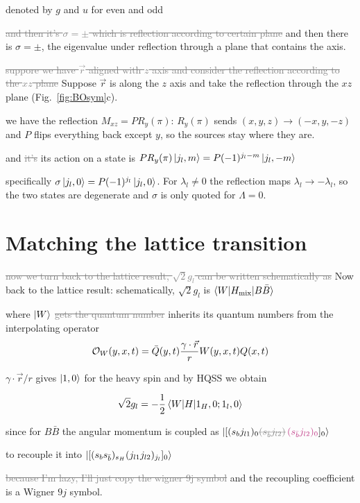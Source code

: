 \documentclass[11pt,a4paper]{article}
\newcommand{\ai}[1]{\textcolor{aicolor}{#1}}
\newcommand{\aifix}[2]{\textcolor{gray}{\sout{#1}} \textcolor{aicolor}{#2}}
\newcommand{\aifixm}[2]{\textcolor{gray}{\text{\sout{$#1$}}}\,\textcolor{aicolor}{#2}}
\newcommand{\ai}[1]{#1}
\newcommand{\aifix}[2]{#2}
\newcommand{\aifixm}[2]{#2}
\begin{document}
denoted by $g$ and $u$ for even and odd

\aifix{and then it's $\sigma = \pm$ which is reflection according to certain plane}{and then there is $\sigma=\pm$, the eigenvalue under reflection through a plane that contains the axis.}

\aifix{suppore we have $\vec{r}$ aligned with $z$ axis and consider the reflection according to the $xz$ plane}{Suppose $\vec r$ is along the $z$ axis and take the reflection through the $xz$ plane (Fig.~\ref{fig:BOsym}c).}

we have the reflection $M_{xz} = P R_y(\pi)$\ai{: $R_y(\pi)$ sends $(x,y,z)\to(-x,y,-z)$ and $P$ flips everything back except $y$, so the sources stay where they are.}

and \aifix{it's}{its} action on a state is $P R_y(\pi)\ket{j_l, m} = P(-1)^{j_l - m}\ket{j_l,-m}$

specifically $\sigma\ket{j_l,0} = P(-1)^{j_l}\ket{j_l,0}$\ai{. For $\lambda_l\neq0$ the reflection maps $\lambda_l\to-\lambda_l$, so the two states are degenerate and $\sigma$ is only quoted for $\Lambda=0$.}

\section{Matching the lattice transition}

\aifix{now we turn back to the lattice result, $\sqrt{2}g_l$ can be written schematically as}{Now back to the lattice result: schematically, $\sqrt{2}g_l$ is} $\braket{W|H_\text{mix}|B\bar{B}}$

where $\ket{W}$ \aifix{gets the quantum number}{inherits its quantum numbers} from the interpolating operator $$\mathcal{O}_W(y,x,t) = \bar{Q}(y,t)\frac{\bold{\gamma}\cdot\vec{r}}{r}W(y,x,t)Q(x,t)$$

$\gamma\cdot\vec{r}/r$ gives $\ket{1,0}$ for the heavy spin and by HQSS we obtain

$$\sqrt{2}g_l = -\frac{1}{2}\braket{W|H|1_H,0;1_l,0}$$

since for $B\bar{B}$ the angular momentum is coupled as $\ket{[(s_b j_{l1})_0\aifixm{(s_{\bar{b}} j_{l2})}{(s_{\bar{b}} j_{l2})_0}]_0}$

to recouple it into $\ket{[(s_b s_{\bar{b}})_{s_H} (j_{l1}j_{l2})_{j_l}]_0}$

\aifix{because I'm lazy, I'll just copy the wigner 9j symbol}{and the recoupling coefficient is a Wigner $9j$ symbol.}
\end{document}
